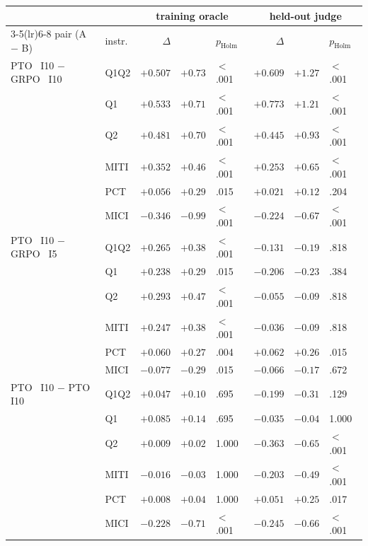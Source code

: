 \begin{table}[t]
  \centering\footnotesize
  \setlength{\tabcolsep}{4pt}
  \begin{tabular}{@{}l l rrl rrl@{}}
    \toprule
    & & \multicolumn{3}{c}{training oracle} & \multicolumn{3}{c}{held-out judge} \\
    \cmidrule(lr){3-5}\cmidrule(lr){6-8}
    pair (A $-$ B) & instr. & $\Delta$ & \dz{} & $p_{\text{Holm}}$ & $\Delta$ & \dz{} & $p_{\text{Holm}}$ \\
    \midrule
PTO~\Kz{} I10 $-$ GRPO~\Kz{} I10 & Q1Q2 & $+0.507$ & $+0.73$ & $<$.001 & $+0.609$ & $+1.27$ & $<$.001 \\
 & Q1 & $+0.533$ & $+0.71$ & $<$.001 & $+0.773$ & $+1.21$ & $<$.001 \\
 & Q2 & $+0.481$ & $+0.70$ & $<$.001 & $+0.445$ & $+0.93$ & $<$.001 \\
 & MITI & $+0.352$ & $+0.46$ & $<$.001 & $+0.253$ & $+0.65$ & $<$.001 \\
 & PCT & $+0.056$ & $+0.29$ & .015 & $+0.021$ & $+0.12$ & .204 \\
 & MICI & $-0.346$ & $-0.99$ & $<$.001 & $-0.224$ & $-0.67$ & $<$.001 \\
\addlinespace[2pt]
PTO~\Kf{} I10 $-$ GRPO~\Kf{} I5 & Q1Q2 & $+0.265$ & $+0.38$ & $<$.001 & $-0.131$ & $-0.19$ & .818 \\
 & Q1 & $+0.238$ & $+0.29$ & .015 & $-0.206$ & $-0.23$ & .384 \\
 & Q2 & $+0.293$ & $+0.47$ & $<$.001 & $-0.055$ & $-0.09$ & .818 \\
 & MITI & $+0.247$ & $+0.38$ & $<$.001 & $-0.036$ & $-0.09$ & .818 \\
 & PCT & $+0.060$ & $+0.27$ & .004 & $+0.062$ & $+0.26$ & .015 \\
 & MICI & $-0.077$ & $-0.29$ & .015 & $-0.066$ & $-0.17$ & .672 \\
\addlinespace[2pt]
PTO~\Kf{} I10 $-$ PTO~\Kz{} I10 & Q1Q2 & $+0.047$ & $+0.10$ & .695 & $-0.199$ & $-0.31$ & .129 \\
 & Q1 & $+0.085$ & $+0.14$ & .695 & $-0.035$ & $-0.04$ & 1.000 \\
 & Q2 & $+0.009$ & $+0.02$ & 1.000 & $-0.363$ & $-0.65$ & $<$.001 \\
 & MITI & $-0.016$ & $-0.03$ & 1.000 & $-0.203$ & $-0.49$ & $<$.001 \\
 & PCT & $+0.008$ & $+0.04$ & 1.000 & $+0.051$ & $+0.25$ & .017 \\
 & MICI & $-0.228$ & $-0.71$ & $<$.001 & $-0.245$ & $-0.66$ & $<$.001 \\

\end{tabular}
\end{table}

